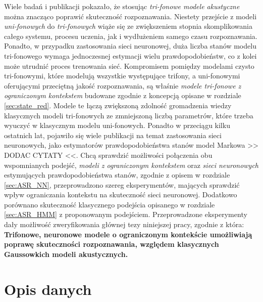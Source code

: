 \documentclass[shortabstract, mgr]{iithesis}
\begin{document}
	Wiele badań i publikacji pokazało, że stosując \textit{tri-fonowe modele akustyczne} można znacząco poprawić skuteczność rozpoznawania. Niestety przejście z modeli \textit{uni-fonowych} do \textit{tri-fonowych} wiąże się ze zwiększeniem stopnia skomplikowania całego systemu, procesu uczenia, jak i wydłużeniem samego czasu rozpoznawania. Ponadto, w przypadku zastosowania sieci neuronowej, duża liczba stanów modelu tri-fonowego wymaga jednoczesnej estymacji wielu prawdopodobieństw, co z kolei może utrudnić proces trenowania sieć. Kompromisem pomiędzy modelami czysto tri-fonowymi, które modelują wszystkie występujące trifony, a uni-fonowymi oferującymi przeciętną jakość rozpoznawania, są właśnie \textit{modele tri-fonowe z ograniczonym kontekstem} budowane zgodnie z koncepcją opisane w rozdziale \ref{sec:state_red}. Modele te łączą zwiększoną zdolność gromadzenia wiedzy klasycznych modeli tri-fonowych ze zmniejszoną liczbą parametrów, które trzeba wyuczyć w klasycznym modelu uni-fonowych. Ponadto w przeciągu kilku ostatnich lat, pojawiło się wiele publikacji na temat zastosowania sieci neuronowych, jako estymatorów prawdopodobieństwa stanów model Markowa >> DODAC CYTATY <<. Chcą sprawdzić możliwości połączenia obu wspomnianych podejść, \textit{modeli z ograniczonym kontekstem} oraz \textit{sieci neuronowych} estymujących prawdopodobieństwa stanów, zgodnie z opisem w rozdziale \ref{sec:ASR_NN}, przeprowadzono szereg eksperymentów, mających sprawdzić wpływ ograniczania kontekstu na skuteczność sieci neuronowej. Dodatkowo porównano skuteczność klasycznego podejścia opisanego w rozdziale \ref{sec:ASR_HMM} z proponowanym podejściem. Przeprowadzone eksperymenty dały możliwość zweryfikowania głównej tezy niniejszej pracy, zgodnie z która: \textbf{Trifonowe, neuronowe modele o ograniczonym kontekście umożliwiają poprawę skuteczności rozpoznawania, względem klasycznych Gaussowkich modeli akustycznych.}
	
	\section{ Opis danych}
	\label{sec:opis_danych}
	
\end{document}

